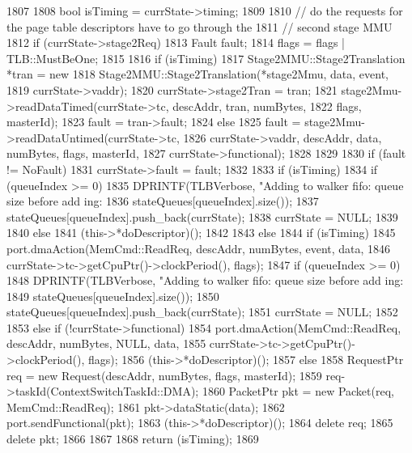 \begin{DoxyCode}
1807 {
1808     bool isTiming = currState->timing;
1809 
1810     // do the requests for the page table descriptors have to go through the
1811     // second stage MMU
1812     if (currState->stage2Req) {
1813         Fault fault;
1814         flags = flags | TLB::MustBeOne;
1815 
1816         if (isTiming) {
1817             Stage2MMU::Stage2Translation *tran = new
1818                 Stage2MMU::Stage2Translation(*stage2Mmu, data, event,
1819                                              currState->vaddr);
1820             currState->stage2Tran = tran;
1821             stage2Mmu->readDataTimed(currState->tc, descAddr, tran, numBytes,
1822                                      flags, masterId);
1823             fault = tran->fault;
1824         } else {
1825             fault = stage2Mmu->readDataUntimed(currState->tc,
1826                 currState->vaddr, descAddr, data, numBytes, flags, masterId,
1827                 currState->functional);
1828         }
1829 
1830         if (fault != NoFault) {
1831             currState->fault = fault;
1832         }
1833         if (isTiming) {
1834             if (queueIndex >= 0) {
1835                 DPRINTF(TLBVerbose, "Adding to walker fifo: queue size before add
      ing: %
1836                         stateQueues[queueIndex].size());
1837                 stateQueues[queueIndex].push_back(currState);
1838                 currState = NULL;
1839             }
1840         } else {
1841             (this->*doDescriptor)();
1842         }
1843     } else {
1844         if (isTiming) {
1845             port.dmaAction(MemCmd::ReadReq, descAddr, numBytes, event, data,
1846                            currState->tc->getCpuPtr()->clockPeriod(), flags);
1847             if (queueIndex >= 0) {
1848                 DPRINTF(TLBVerbose, "Adding to walker fifo: queue size before add
      ing: %
1849                         stateQueues[queueIndex].size());
1850                 stateQueues[queueIndex].push_back(currState);
1851                 currState = NULL;
1852             }
1853         } else if (!currState->functional) {
1854             port.dmaAction(MemCmd::ReadReq, descAddr, numBytes, NULL, data,
1855                            currState->tc->getCpuPtr()->clockPeriod(), flags);
1856             (this->*doDescriptor)();
1857         } else {
1858             RequestPtr req = new Request(descAddr, numBytes, flags, masterId);
1859             req->taskId(ContextSwitchTaskId::DMA);
1860             PacketPtr  pkt = new Packet(req, MemCmd::ReadReq);
1861             pkt->dataStatic(data);
1862             port.sendFunctional(pkt);
1863             (this->*doDescriptor)();
1864             delete req;
1865             delete pkt;
1866         }
1867     }
1868     return (isTiming);
1869 }
\end{DoxyCode}
